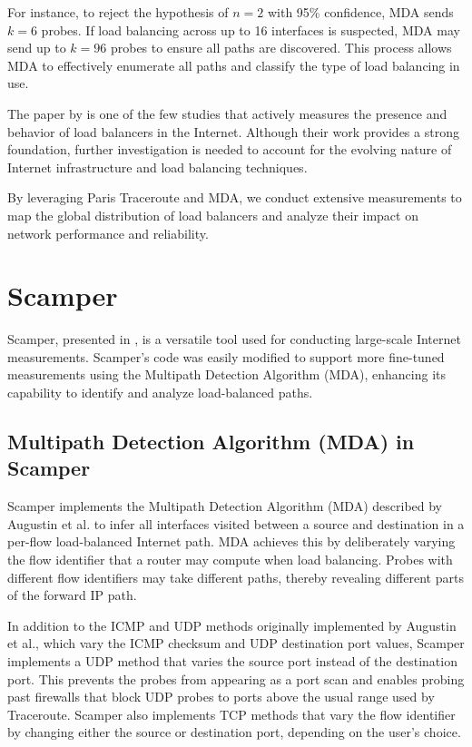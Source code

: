 \documentclass[12pt]{cwru_thesis}
\begin{document}
For instance, to reject the hypothesis of \(n = 2\) with 95\% confidence, MDA sends \(k = 6\) probes. If load balancing across up to 16 interfaces is suspected, MDA may send up to \(k = 96\) probes to ensure all paths are discovered. This process allows MDA to effectively enumerate all paths and classify the type of load balancing in use.


The paper by  \cite{4261334} is one of the few studies that actively measures the presence and behavior of load balancers in the Internet. Although their work provides a strong foundation, further investigation is needed to account for the evolving nature of Internet infrastructure and load balancing techniques.

By leveraging Paris Traceroute and MDA, we conduct extensive measurements to map the global distribution of load balancers and analyze their impact on network performance and reliability.


\section{Scamper}

Scamper, presented in  \cite{luckie2010scamper}, is a versatile tool used for conducting large-scale Internet measurements. Scamper's code was easily modified to support more fine-tuned measurements using the Multipath Detection Algorithm (MDA), enhancing its capability to identify and analyze load-balanced paths.



\subsection{Multipath Detection Algorithm (MDA) in Scamper}

Scamper implements the Multipath Detection Algorithm (MDA) described by Augustin et al. to infer all interfaces visited between a source and destination in a per-flow load-balanced Internet path. MDA achieves this by deliberately varying the flow identifier that a router may compute when load balancing. Probes with different flow identifiers may take different paths, thereby revealing different parts of the forward IP path.

In addition to the ICMP and UDP methods originally implemented by Augustin et al., which vary the ICMP checksum and UDP destination port values, Scamper implements a UDP method that varies the source port instead of the destination port. This prevents the probes from appearing as a port scan and enables probing past firewalls that block UDP probes to ports above the usual range used by Traceroute. Scamper also implements TCP methods that vary the flow identifier by changing either the source or destination port, depending on the user’s choice.
\end{document}
